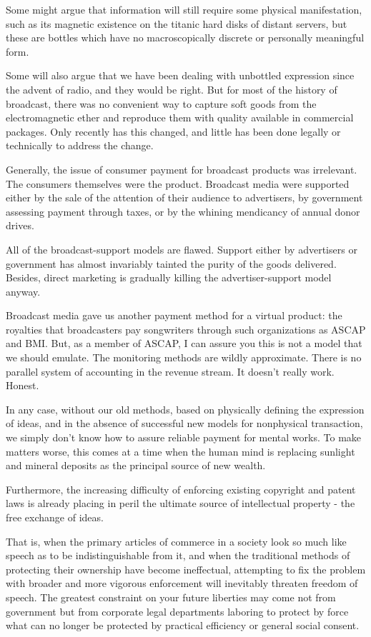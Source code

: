 \documentclass[
]{article}
\begin{document}
Some might argue that information will still require some physical
manifestation, such as its magnetic existence on the titanic hard disks
of distant servers, but these are bottles which have no macroscopically
discrete or personally meaningful form.

Some will also argue that we have been dealing with unbottled expression
since the advent of radio, and they would be right. But for most of the
history of broadcast, there was no convenient way to capture soft goods
from the electromagnetic ether and reproduce them with quality available
in commercial packages. Only recently has this changed, and little has
been done legally or technically to address the change.

Generally, the issue of consumer payment for broadcast products was
irrelevant. The consumers themselves were the product. Broadcast media
were supported either by the sale of the attention of their audience to
advertisers, by government assessing payment through taxes, or by the
whining mendicancy of annual donor drives.

All of the broadcast-support models are flawed. Support either by
advertisers or government has almost invariably tainted the purity of
the goods delivered. Besides, direct marketing is gradually killing the
advertiser-support model anyway.

Broadcast media gave us another payment method for a virtual product:
the royalties that broadcasters pay songwriters through such
organizations as ASCAP and BMI. But, as a member of ASCAP, I can assure
you this is not a model that we should emulate. The monitoring methods
are wildly approximate. There is no parallel system of accounting in the
revenue stream. It doesn't really work. Honest.

In any case, without our old methods, based on physically defining the
expression of ideas, and in the absence of successful new models for
nonphysical transaction, we simply don't know how to assure reliable
payment for mental works. To make matters worse, this comes at a time
when the human mind is replacing sunlight and mineral deposits as the
principal source of new wealth.

Furthermore, the increasing difficulty of enforcing existing copyright
and patent laws is already placing in peril the ultimate source of
intellectual property - the free exchange of ideas.

That is, when the primary articles of commerce in a society look so much
like speech as to be indistinguishable from it, and when the traditional
methods of protecting their ownership have become ineffectual,
attempting to fix the problem with broader and more vigorous enforcement
will inevitably threaten freedom of speech. The greatest constraint on
your future liberties may come not from government but from corporate
legal departments laboring to protect by force what can no longer be
protected by practical efficiency or general social consent.
\end{document}
